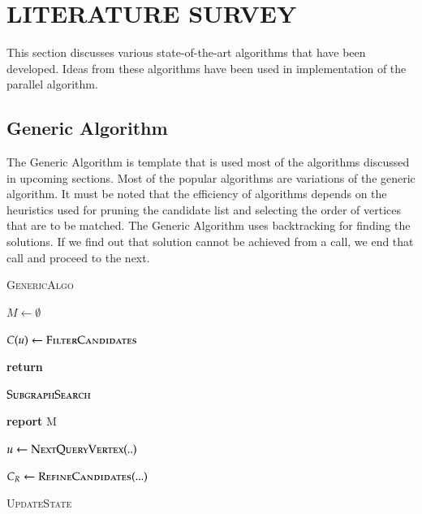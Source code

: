 \chapter{LITERATURE SURVEY}
\label{chap:lit}

This section discusses various state-of-the-art algorithms that have been developed. Ideas from these algorithms have been used in implementation of the parallel algorithm.

\section{Generic Algorithm}

The Generic Algorithm is template that is used most of the algorithms discussed in upcoming sections. Most of the popular algorithms are variations of the generic algorithm. It must be noted that the efficiency of algorithms depends on the heuristics used for pruning the candidate list and selecting the order of vertices that are to be matched. The Generic Algorithm uses backtracking for finding the solutions. If we find out that solution cannot be achieved from a call, we end that call and proceed to the next.

\begin{algorithm}

\caption{\textsc{GenericAlgo}}\label{euclid}

\begin{algorithmic}[1]



\State $M \gets \emptyset$


\State $C(u) \gets \textsc{FilterCandidates}$


\State \textbf{return}

\EndIf

\EndFor

\State $\textsc{SubgraphSearch}$ 



    \State \textbf{report} M

    \Else

    \State $u \gets \textsc{NextQueryVertex}(..)$

    \State $C_R \gets \textsc{RefineCandidates}(...)$



            \State \textsc{UpdateState}

        \EndIf

    \EndFor

\EndIf

\EndProcedure

\end{algorithmic}

\end{algorithm}

